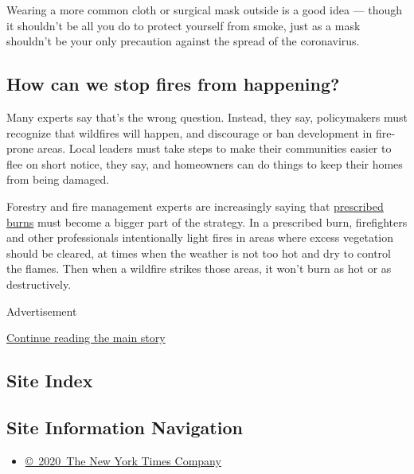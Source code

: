 Wearing a more common cloth or surgical mask outside is a good idea ---
though it shouldn't be all you do to protect yourself from smoke, just
as a mask shouldn't be your only precaution against the spread of the
coronavirus.

\hypertarget{how-can-we-stop-fires-from-happening}{%
\subsection{How can we stop fires from
happening?}\label{how-can-we-stop-fires-from-happening}}

Many experts say that's the wrong question. Instead, they say,
policymakers must recognize that wildfires will happen, and discourage
or ban development in fire-prone areas. Local leaders must take steps to
make their communities easier to flee on short notice, they say, and
homeowners can do things to keep their homes from being damaged.

Forestry and fire management experts are increasingly saying that
\href{https://www.nytimes3xbfgragh.onion/2020/08/26/us/california-fire-prevention.html}{prescribed
burns} must become a bigger part of the strategy. In a prescribed burn,
firefighters and other professionals intentionally light fires in areas
where excess vegetation should be cleared, at times when the weather is
not too hot and dry to control the flames. Then when a wildfire strikes
those areas, it won't burn as hot or as destructively.

Advertisement

\protect\hyperlink{after-bottom}{Continue reading the main story}

\hypertarget{site-index}{%
\subsection{Site Index}\label{site-index}}

\hypertarget{site-information-navigation}{%
\subsection{Site Information
Navigation}\label{site-information-navigation}}

\begin{itemize}
\tightlist
\item
  \href{https://help.nytimes3xbfgragh.onion/hc/en-us/articles/115014792127-Copyright-notice}{©~2020~The
  New York Times Company}
\end{itemize}

